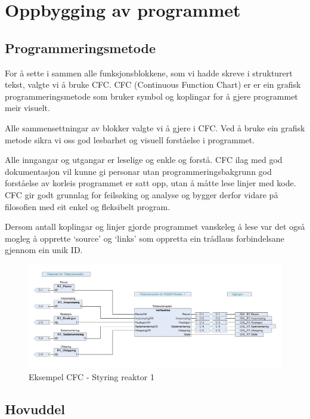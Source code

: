 \newpage
\section{Oppbygging av programmet}
\thispagestyle{fancy}

\subsection{Programmeringsmetode}
For å sette i sammen alle funksjonsblokkene, som vi hadde skreve i strukturert tekst, valgte vi å bruke  CFC.
CFC (Continuous Function Chart) er er ein grafisk programmeringsmetode som bruker symbol og koplingar for å gjere programmet  meir visuelt.

Alle sammensettningar av blokker valgte vi å gjere i CFC. Ved å bruke ein grafisk metode sikra vi oss god lesbarhet og
visuell forståelse i programmet. 

Alle inngangar og utgangar er leselige og enkle og forstå. CFC ilag med god dokumentasjon vil kunne gi personar utan programmeringsbakgrunn
god forståelse av korleis programmet er satt opp, utan å måtte lese linjer med kode.
CFC gir godt grunnlag for feilsøking og analyse og bygger derfor vidare på filosofien med eit enkel og fleksibelt program.

Dersom antall koplingar og linjer gjorde programmet vanskeleg å lese var det også
mogleg å opprette `source' og `links' som oppretta ein trådlaus forbindelsane gjennom ein unik ID.


\begin{figure}[htbp]
    \centering
    \includegraphics[width=1\textwidth]{Bilder/ReaktorPRG.png}
    \caption{Eksempel CFC - Styring reaktor 1}\label{fig:reaktorsoner}
\end{figure}

\newpage

\subsection{Hovuddel}


